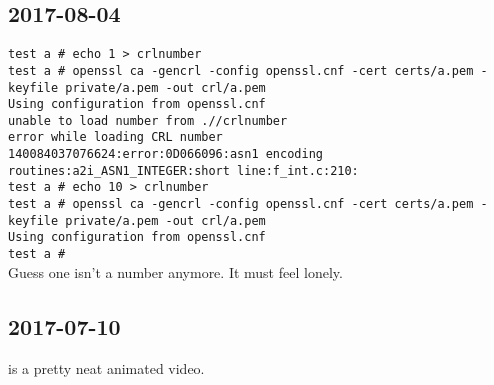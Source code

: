 \documentclass{article}
\begin{document}
\subsection{2017-08-04}
\texttt{test a # echo 1 > crlnumber \\
test a # openssl ca -gencrl -config openssl.cnf -cert certs/a.pem -keyfile private/a.pem -out crl/a.pem \\
Using configuration from openssl.cnf \\
unable to load number from .//crlnumber \\
error while loading CRL number \\
140084037076624:error:0D066096:asn1 encoding routines:a2i_ASN1_INTEGER:short line:f_int.c:210: \\
test a # echo 10 > crlnumber \\
test a # openssl ca -gencrl -config openssl.cnf -cert certs/a.pem -keyfile private/a.pem -out crl/a.pem \\
Using configuration from openssl.cnf \\
test a #} \\
Guess one isn't a number anymore.  It must feel lonely.

\subsection{2017-07-10}
 is a pretty neat animated video.
\end{document}
